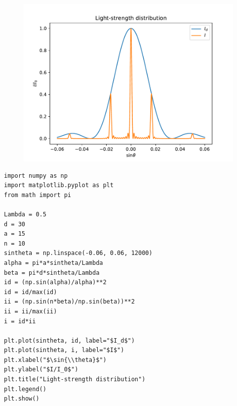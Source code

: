 \documentclass{article}
\begin{document}
\begin{figure}[!ht]
    \centering
    \includegraphics[width=15cm]{FRP.pdf}
\end{figure}

\begin{lstlisting}
import numpy as np
import matplotlib.pyplot as plt
from math import pi

Lambda = 0.5
d = 30
a = 15
n = 10
sintheta = np.linspace(-0.06, 0.06, 12000)
alpha = pi*a*sintheta/Lambda
beta = pi*d*sintheta/Lambda
id = (np.sin(alpha)/alpha)**2
id = id/max(id)
ii = (np.sin(n*beta)/np.sin(beta))**2
ii = ii/max(ii)
i = id*ii

plt.plot(sintheta, id, label="$I_d$")
plt.plot(sintheta, i, label="$I$")
plt.xlabel("$\sin{\\theta}$")
plt.ylabel("$I/I_0$")
plt.title("Light-strength distribution")
plt.legend()
plt.show()
\end{lstlisting}
\end{document}
